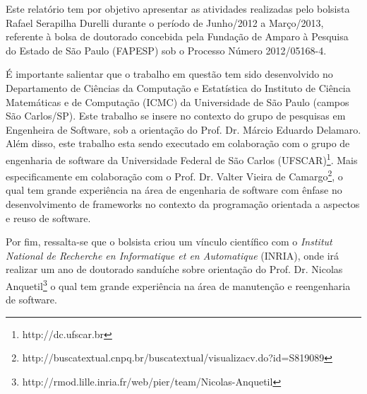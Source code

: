  Este relatório tem por objetivo apresentar as atividades realizadas pelo bolsista Rafael Serapilha Durelli durante o período de Junho/2012 a Março/2013,
 referente à bolsa de doutorado concebida pela Fundação de Amparo à Pesquisa do Estado de São Paulo (FAPESP) sob o Processo Número 2012/05168-4. 
 
 É importante salientar que o trabalho em questão tem sido desenvolvido no Departamento de Ciências da Computação e Estatística do Instituto de Ciência 
 Matemáticas e de Computação (ICMC) da Universidade de São Paulo (campos São Carlos/SP).  
 Este trabalho se insere no contexto do grupo de pesquisas em Engenheira de Software, sob a orientação do Prof. Dr. Márcio Eduardo Delamaro.  
 Além disso, este trabalho esta sendo executado em colaboração com o grupo de engenharia de software da Universidade Federal de São Carlos (UFSCAR)\footnote{http://dc.ufscar.br}.  
 Mais especificamente em colaboração com o Prof. Dr. Valter Vieira de Camargo\footnote{http://buscatextual.cnpq.br/buscatextual/visualizacv.do?id=S819089},
 o qual tem grande experiência na área de engenharia de software com ênfase no desenvolvimento de frameworks no contexto da programação orientada a aspectos e reuso de software. 

Por fim, ressalta-se que o bolsista criou um vínculo científico com o \textit{Institut National de Recherche en Informatique et en Automatique} (INRIA),  
onde irá realizar um ano de doutorado sanduíche sobre orientação do  
 Prof. Dr. Nicolas Anquetil\footnote{http://rmod.lille.inria.fr/web/pier/team/Nicolas-Anquetil} o qual tem grande experiência na área de manutenção e reengenharia de software.